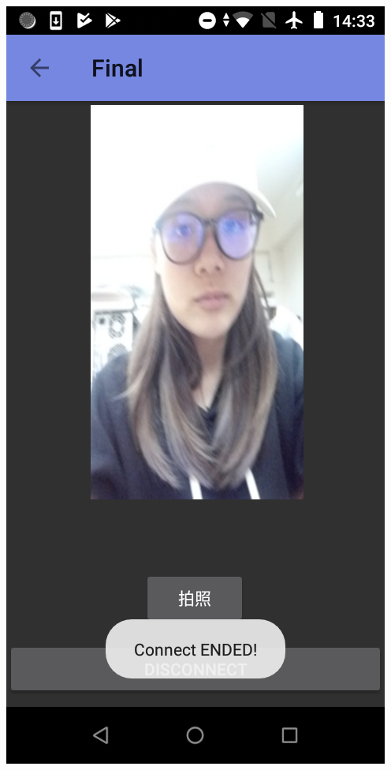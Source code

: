 \documentclass[12pt]{article}  %
\theoremstyle{plain}
\begin{document}
\begin{itemize}
\includegraphics[scale=0.2]{pic/ch4/game05.png}


\end{itemize}
\end{document}

